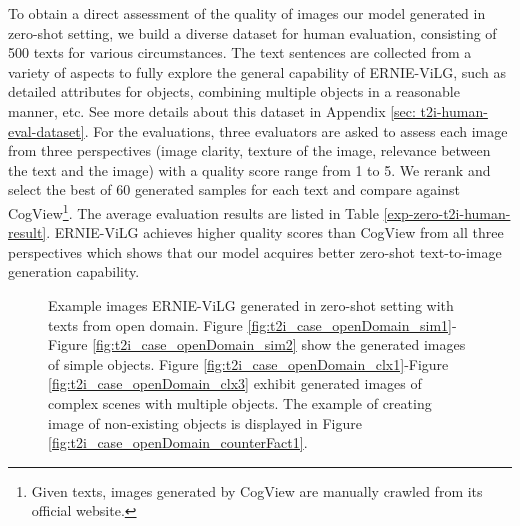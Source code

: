 \documentclass{article}
\begin{document}
To obtain a direct assessment of the quality of images our model generated in zero-shot setting, we build a diverse dataset for human evaluation, consisting of 500 texts for various circumstances. 
The text sentences are collected from a variety of aspects to fully explore the general capability of ERNIE-ViLG, such as detailed attributes for objects, combining multiple objects in a reasonable manner, etc. See more details about this dataset in Appendix \ref{sec: t2i-human-eval-dataset}. 
For the evaluations, three evaluators are asked to assess each image from three perspectives (image clarity, texture of the image, relevance between the text and the image) with a quality score range from 1 to 5. We rerank and select the best of 60 generated samples for each text and compare against CogView\footnote{Given texts, images generated by CogView are manually crawled from its official website.}. 
The average evaluation results are listed in Table \ref{exp-zero-t2i-human-result}. ERNIE-ViLG achieves higher quality scores than CogView \cite{ding2021cogview} from all three perspectives which shows that our model acquires better zero-shot text-to-image generation capability.

\begin{figure}[htb]
    \centering
    \caption{Example images ERNIE-ViLG generated in zero-shot setting with texts from open domain. Figure \ref{fig:t2i_case_openDomain_sim1}-Figure \ref{fig:t2i_case_openDomain_sim2} show the generated images of simple objects. Figure \ref{fig:t2i_case_openDomain_clx1}-Figure \ref{fig:t2i_case_openDomain_clx3} exhibit generated images of complex scenes with multiple objects. The example of creating image of non-existing objects is displayed in Figure \ref{fig:t2i_case_openDomain_counterFact1}.}
    \label{fig:t2i_case_openDomain}
\end{figure}
\end{document}
